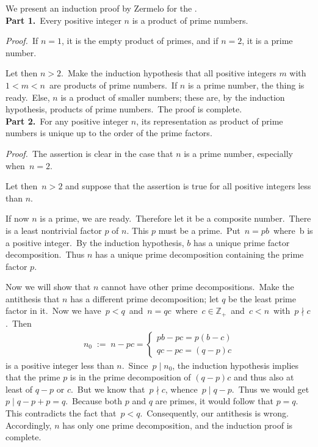 \documentclass[12pt]{article}
\begin{document}
We present an induction proof by Zermelo for the 
.\\

\textbf{Part 1.}\, Every positive integer $n$ is a product of prime numbers.

{\it Proof.}\, If $n = 1$, it is the empty product of primes, and 
if $n =2$, it is a prime number.

Let then $n > 2$.\, Make the induction hypothesis that all positive 
integers $m$ with\, $1 < m < n$\, are products of prime numbers.\, 
If $n$ is a prime number, the thing is ready.\, Else, $n$ is a 
product of smaller numbers; these are, by the induction hypothesis, 
products of prime numbers.\, The proof is complete.\\

\textbf{Part 2.}\, For any positive integer $n$, its representation 
as product of prime numbers is unique up to the order of the 
prime factors.
 
{\it Proof.}\, The assertion is clear in the case that $n$ is a 
prime number, especially when\, $n = 2$.

Let then\, $n > 2$ and suppose that the assertion is true for 
all positive integers less than $n$.
  
If now $n$ is a prime, we are ready.\, Therefore let it be a 
composite number.\, There is a least nontrivial factor $p$ of $n$. 
This $p$ must be a prime.\, Put\, $n = pb$\, where\, b is a 
positive integer.\, By the induction hypothesis, $b$ has a 
unique prime factor decomposition.\, Thus $n$ has a unique prime 
decomposition containing the prime factor $p$.

Now we will show that $n$ cannot have other prime decompositions.\, 
Make the antithesis that $n$ has a different prime decomposition; 
let $q$ be the least prime factor in it.\, Now we have\, $p < q$\, 
and\, $n = qc$\, where\, $c \in \mathbb{Z}_+$\, and\, $c < n$\, 
with\, $p \nmid c$.\, Then
\begin{align*}
n_0 \;:=\; n-pc = 
    \begin{cases}
      pb-pc = p(b-c)\\
      qc-pc = (q-p)c  
    \end{cases}
\end{align*}
is a positive integer less than $n$.\, Since\, $p \mid n_0$, the 
induction hypothesis implies that the prime $p$ is in the prime 
decomposition of $(q-p)c$ and thus also at least of $q\!-\!p$ 
or $c$.\, But we know that\, $p \nmid c$, whence\, $p \mid q-p$.\, 
Thus we would get\, $p \mid q\!-\!p\!+\!p = q$.\, Because both $p$ 
and $q$ are primes, it would follow that $p = q$.\, This 
contradicts the fact that\, $p < q$.\, Consequently, our 
antithesis is wrong.\, Accordingly, $n$ has only one prime 
decomposition, and the induction proof is complete.
\end{document}
